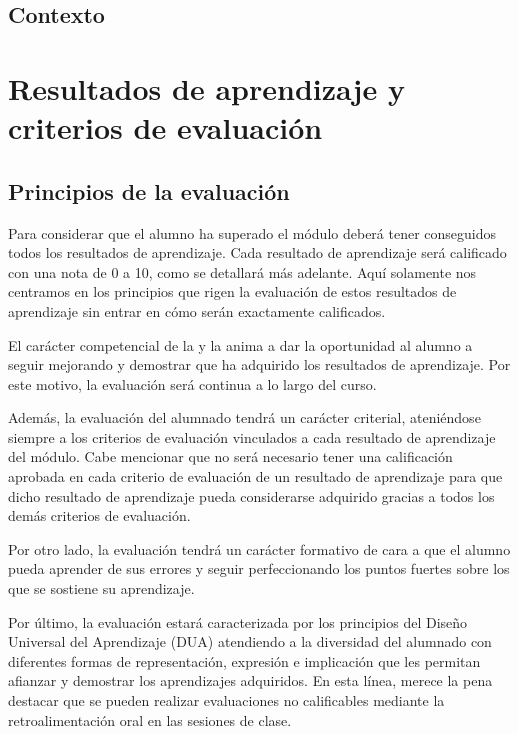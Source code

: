 \documentclass{didactica}
\newcommand{\lawref}[1]{\nameref{#1}}
\begin{document}
\section{Contexto}


\chapter{Resultados de aprendizaje y criterios de evaluación}




\section{Principios de la evaluación}
\label{sec:principios_de_la_evaluaci_n}

Para considerar que el alumno ha superado el módulo deberá tener conseguidos todos los resultados de aprendizaje. Cada resultado de aprendizaje será calificado con una nota de 0 a 10, como se detallará más adelante. 
%
Aquí solamente nos centramos en los principios que rigen la evaluación de estos resultados de aprendizaje sin entrar en cómo serán exactamente calificados.

El carácter competencial de la \lawref{ley:lomloe} y la \lawref{ley:nueva-fp} anima a dar la oportunidad al alumno a seguir mejorando y demostrar que ha adquirido los resultados de aprendizaje. 
%
Por este motivo, la evaluación será continua a lo largo del curso. 


Además, la evaluación del alumnado tendrá un carácter criterial, ateniéndose siempre a los criterios de evaluación vinculados a cada resultado de aprendizaje del módulo. 
%
Cabe mencionar que no será necesario tener una calificación aprobada en cada criterio de evaluación de un resultado de aprendizaje para que dicho resultado de aprendizaje pueda considerarse adquirido gracias a todos los demás criterios de evaluación. 

Por otro lado, la evaluación tendrá un carácter formativo de cara a que el alumno pueda aprender de sus errores y seguir perfeccionando los puntos fuertes sobre los que se sostiene su aprendizaje. 

Por último, la evaluación estará caracterizada por los principios del  Diseño Universal del Aprendizaje (DUA) atendiendo a la diversidad del alumnado con diferentes formas de representación, expresión e implicación que les permitan afianzar y demostrar los aprendizajes adquiridos. 
%
En esta línea, merece la pena destacar que se pueden realizar evaluaciones no calificables mediante la retroalimentación oral en las sesiones de clase.
\end{document}
